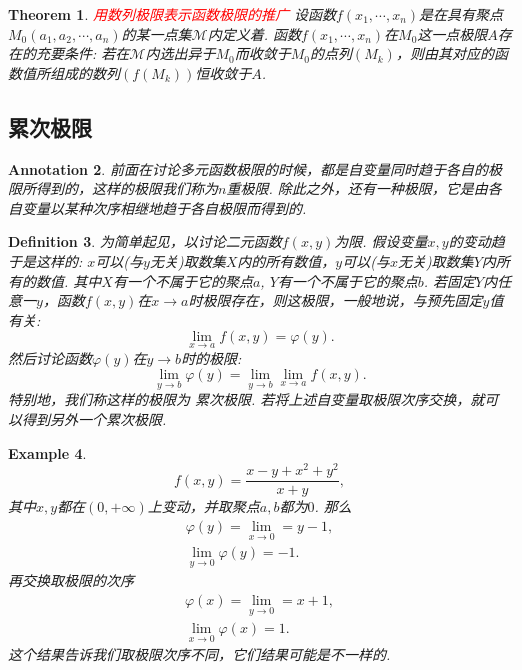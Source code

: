 \documentclass{article}
\newtheorem{theorem}{Theorem}[section]
\newtheorem{example}[theorem]{Example}
\newtheorem{definition}[theorem]{Definition}
\newtheorem{annotation}[theorem]{Annotation}
\newcommand{\redt}[1]{\textcolor{red}{#1}}
\begin{document}
\begin{theorem}
\rm \redt{用数列极限表示函数极限的推广} 设函数$f(x_1,\cdots,x_n)$是在具有聚点$M_0(a_1,a_2,\cdots,a_n)$的某一点集$\mathcal{M}$内定义着. 函数$f(x_1,\cdots,x_n)$在$M_0$这一点极限$A$存在的充要条件: 若在$\mathcal{M}$内选出异于$M_0$而收敛于$M_0$的点列$(M_k)$，则由其对应的函数值所组成的数列$(f(M_k))$恒收敛于$A$. 
\end{theorem}

\subsection{累次极限}

\begin{annotation}
\rm 前面在讨论多元函数极限的时候，都是自变量同时趋于各自的极限所得到的，这样的极限我们称为{\color{red}$n$重极限}. 除此之外，还有一种极限，它是由各自变量以某种次序相继地趋于各自极限而得到的.
\end{annotation}

\begin{definition}
\rm 为简单起见，以讨论二元函数$f(x,y)$为限. 假设变量$x,y$的变动趋于是这样的: $x$可以(与$y$无关)取数集$X$内的所有数值，$y$可以(与$x$无关)取数集$Y$内所有的数值. 其中$X$有一个不属于它的聚点$a$, $Y$有一个不属于它的聚点$b$. 若固定$Y$内任意一$y$，函数$f(x,y)$在$x \rightarrow a$时极限存在，则这极限，一般地说，与预先固定$y$值有关:
$$
\lim\limits_{x \rightarrow a} f(x,y) = \varphi(y).
$$
然后讨论函数$\varphi(y)$在$y \rightarrow b$时的极限:
$$
\lim\limits_{y \rightarrow b} \varphi(y) = \lim\limits_{y \rightarrow b}\lim\limits_{x \rightarrow a} f(x,y).
$$
特别地，我们称这样的极限为{\color{red} 累次极限}. 若将上述自变量取极限次序交换，就可以得到另外一个累次极限.
\end{definition}

\begin{example}
\rm $$
	f(x,y) = \frac{x-y + x^2 + y^2}{x + y},
$$
其中$x,y$都在$(0,+\infty)$上变动，并取聚点$a,b$都为$0$. 那么
$$
\begin{array}{l}
\varphi(y) = \lim\limits_{x \rightarrow 0} = y -1, \\
\lim\limits_{y \rightarrow 0} \varphi(y) = -1.
\end{array}
$$
再交换取极限的次序
$$
\begin{array}{l}
\varphi(x) = \lim\limits_{y \rightarrow 0} = x+1, \\
\lim\limits_{x \rightarrow 0} \varphi(x) = 1.
\end{array}
$$
{\color{red} 这个结果告诉我们取极限次序不同，它们结果可能是不一样的}.
\end{example}
\end{document}
